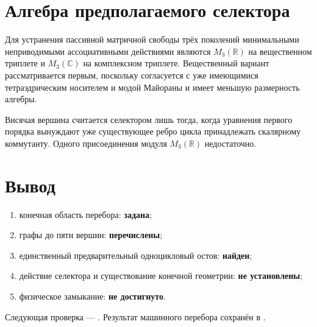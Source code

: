 \section{Алгебра предполагаемого селектора}

Для устранения пассивной матричной свободы трёх поколений минимальными
неприводимыми ассоциативными действиями являются \(M_3(\mathbb R)\) на
вещественном триплете и \(M_3(\mathbb C)\) на комплексном триплете.
Вещественный вариант рассматривается первым, поскольку согласуется с уже
имеющимися тетраэдрическим носителем и модой Майораны и имеет меньшую
размерность алгебры.

\begin{nogocriterion}
Висячая вершина считается селектором лишь тогда, когда уравнения первого
порядка вынуждают уже существующее ребро цикла принадлежать скалярному
коммутанту. Одного присоединения модуля \(M_3(\mathbb R)\) недостаточно.
\end{nogocriterion}

\section{Вывод}

\begin{protocol}
\begin{enumerate}
 \item конечная область перебора: \textbf{задана};
 \item графы до пяти вершин: \textbf{перечислены};
 \item единственный предварительный одноцикловый остов: \textbf{найден};
 \item действие селектора и существование конечной геометрии:
 \textbf{не установлены};
 \item физическое замыкание: \textbf{не достигнуто}.
\end{enumerate}
\end{protocol}

Следующая проверка --- .
Результат машинного перебора сохранён в
.